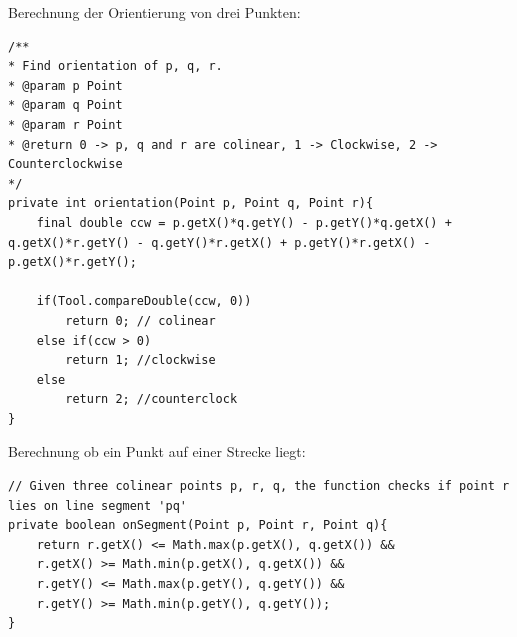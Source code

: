 \documentclass[conference]{IEEEtran}
\begin{document}
Berechnung der Orientierung von drei Punkten:
\begin{lstlisting}
/**
* Find orientation of p, q, r.
* @param p Point
* @param q Point
* @param r Point
* @return 0 -> p, q and r are colinear, 1 -> Clockwise, 2 -> Counterclockwise
*/
private int orientation(Point p, Point q, Point r){
	final double ccw = p.getX()*q.getY() - p.getY()*q.getX() + q.getX()*r.getY() - q.getY()*r.getX() + p.getY()*r.getX() - p.getX()*r.getY();
	
	if(Tool.compareDouble(ccw, 0))
		return 0; // colinear
	else if(ccw > 0)
		return 1; //clockwise
	else
		return 2; //counterclock
}
\end{lstlisting}
	
Berechnung ob ein Punkt auf einer Strecke liegt:
\begin{lstlisting}
// Given three colinear points p, r, q, the function checks if point r lies on line segment 'pq'
private boolean onSegment(Point p, Point r, Point q){
	return r.getX() <= Math.max(p.getX(), q.getX()) &&
	r.getX() >= Math.min(p.getX(), q.getX()) &&
	r.getY() <= Math.max(p.getY(), q.getY()) &&
	r.getY() >= Math.min(p.getY(), q.getY());
}
\end{lstlisting}
	
	
\end{document}
